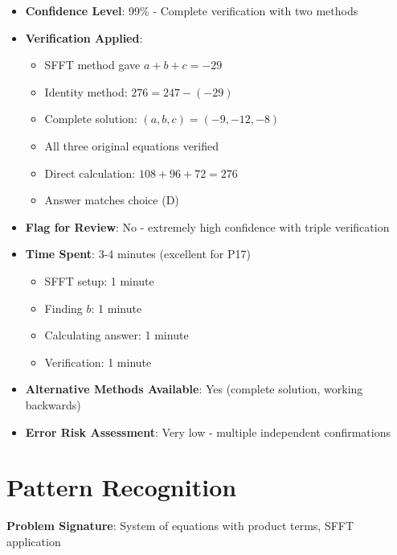 \documentclass[12pt]{article}
\begin{document}
\begin{itemize}[leftmargin=*]
    \item \textbf{Confidence Level}: 99\% - Complete verification with two methods
    
    \item \textbf{Verification Applied}: 
    \begin{itemize}
        \item SFFT method gave $a+b+c = -29$ \checkmark
        \item Identity method: $276 = 247 - (-29)$ \checkmark
        \item Complete solution: $(a,b,c) = (-9, -12, -8)$ \checkmark
        \item All three original equations verified \checkmark
        \item Direct calculation: $108 + 96 + 72 = 276$ \checkmark
        \item Answer matches choice (D) \checkmark
    \end{itemize}
    
    \item \textbf{Flag for Review}: No - extremely high confidence with triple verification
    
    \item \textbf{Time Spent}: 3-4 minutes (excellent for P17)
    \begin{itemize}
        \item SFFT setup: 1 minute
        \item Finding $b$: 1 minute
        \item Calculating answer: 1 minute
        \item Verification: 1 minute
    \end{itemize}
    
    \item \textbf{Alternative Methods Available}: Yes (complete solution, working backwards)
    
    \item \textbf{Error Risk Assessment}: Very low - multiple independent confirmations
\end{itemize}

\section*{Pattern Recognition}

\textbf{Problem Signature}: System of equations with product terms, SFFT application
\end{document}
